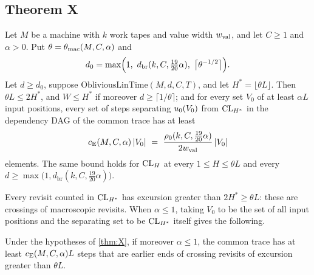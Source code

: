 \subsection{Theorem X}

\begin{theorem}\label{thm:X}
Let $M$ be a machine with $k$ work tapes and value width $w_{\mathrm{val}}$, and let $C\ge1$ and $\alpha>0$. Put $\theta=\theta_{\mathrm{mac}}(M,C,\alpha)$ and
\[
  d_0=\max\Bigl(1,\ d_{\mathrm{br}}(k,C,\tfrac{19}{20}\alpha),\ \bigl\lceil\theta^{-1/2}\bigr\rceil\Bigr).
\]
Let $d\ge d_0$, suppose $\mathrm{ObliviousLinTime}(M,d,C,T)$, and let $H^*=\lfloor\theta L\rfloor$. Then $\theta L\le2H^*$, and
$W\le H^*$ if moreover $d\ge\lceil1/\theta\rceil$; and for every set $V_0$ of at least $\alpha L$ input positions, every set of steps separating $u_0(V_0)$ from
$\mathrm{CL}_{H^*}$ in the dependency DAG of the common trace has at least
\[
  \cE(M,C,\alpha)\,\abs{V_0}\ =\ \frac{\rho_0(k,C,\tfrac{19}{20}\alpha)}{2\wval}\,\abs{V_0}
\]
elements. The same bound holds for $\mathrm{CL}_H$ at every $1\le H\le\theta L$ and every $d\ge\max\bigl(1,d_{\mathrm{br}}(k,C,\tfrac{19}{20}\alpha)\bigr)$.
\end{theorem}

Every revisit counted in $\mathrm{CL}_{H^*}$ has excursion greater than $2H^*\ge\theta L$: these are crossings of macroscopic revisits.
When $\alpha\le1$, taking $V_0$ to be the set of all input positions and the separating set to be $\mathrm{CL}_{H^*}$ itself gives the
following.

\begin{corollary}\label{cor:many}
Under the hypotheses of \cref{thm:X}, if moreover $\alpha\le1$, the common trace has at least $c_{\mathrm{E}}(M,C,\alpha)L$ steps that are
earlier ends of crossing revisits of excursion greater than $\theta L$.
\end{corollary}

